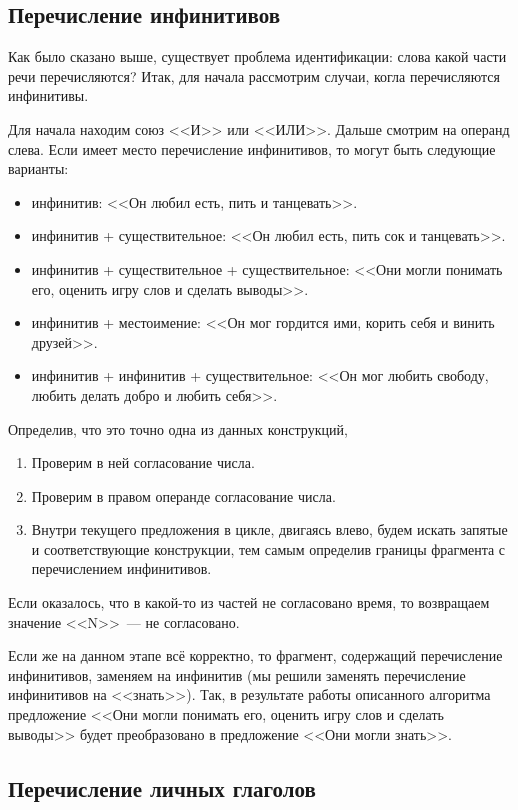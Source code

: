 \documentclass[a4paper,12pt]{article} %
\theoremstyle{definition}
\theoremstyle{plain}
\begin{document}
\subsection*{Перечисление инфинитивов}

Как было сказано выше, существует проблема идентификации: слова какой части речи перечисляются? Итак, для начала рассмотрим случаи, когла перечисляются инфинитивы.

Для начала находим союз <<И>> или <<ИЛИ>>. Дальше смотрим на операнд слева. Если имеет место перечисление инфинитивов, то могут быть следующие варианты:\begin{itemize}
	\item инфинитив: <<Он любил есть, пить и танцевать>>.
	\item инфинитив + существительное: <<Он любил есть, пить сок и танцевать>>.
	\item инфинитив + существительное + существительное: <<Они могли понимать его, оценить игру слов и сделать выводы>>.
	\item инфинитив + местоимение: <<Он мог гордится ими, корить себя и винить друзей>>.
	\item инфинитив + инфинитив + существительное: <<Он мог любить свободу, любить делать добро и любить себя>>.
\end{itemize}

Определив, что это точно одна из данных конструкций, \begin{enumerate}
	\item Проверим в ней согласование числа.
	\item Проверим в правом операнде согласование числа.
	\item Внутри текущего предложения в цикле, двигаясь влево, будем искать запятые и соответствующие конструкции, тем самым определив границы фрагмента с перечислением инфинитивов.
\end{enumerate}

Если оказалось, что в какой-то из частей не согласовано время, то возвращаем значение <<N>>~--- не согласовано.

Если же на данном этапе всё корректно, то фрагмент, содержащий перечисление инфинитивов, заменяем на инфинитив (мы решили заменять перечисление инфинитивов на <<знать>>). Так, в результате работы описанного алгоритма предложение <<Они могли понимать его, оценить игру слов и сделать выводы>> будет преобразовано в предложение <<Они могли знать>>.

\subsection*{Перечисление личных глаголов}
\end{document}

